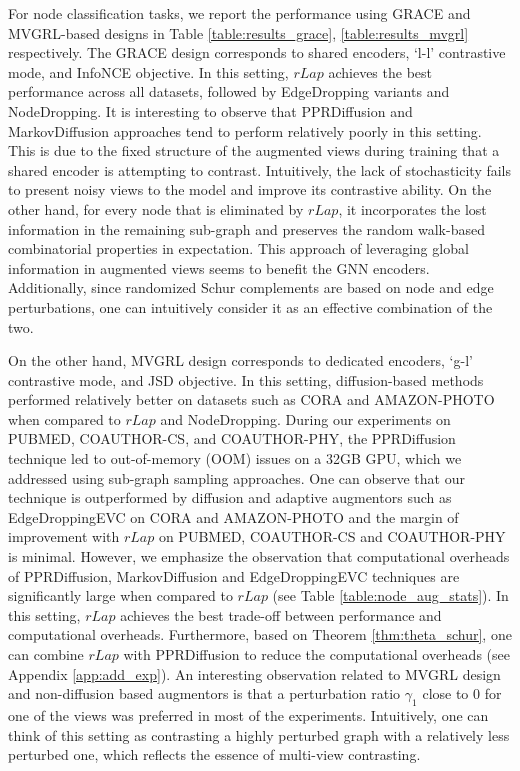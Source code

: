 \documentclass{article}
\theoremstyle{plain}
\theoremstyle{definition}
\theoremstyle{remark}
\begin{document}
For node classification tasks, we report the performance using GRACE and MVGRL-based designs in Table \ref{table:results_grace}, \ref{table:results_mvgrl} respectively. The GRACE design corresponds to shared encoders, `l-l' contrastive mode, and InfoNCE objective. In this setting, $rLap$ achieves the best performance across all datasets, followed by EdgeDropping variants and NodeDropping. It is interesting to observe that PPRDiffusion and MarkovDiffusion approaches tend to perform relatively poorly in this setting. This is due to the fixed structure of the augmented views during training that a shared encoder is attempting to contrast. Intuitively, the lack of stochasticity fails to present noisy views to the model and improve its contrastive ability. On the other hand, for every node that is eliminated by $rLap$, it incorporates the lost information in the remaining sub-graph and preserves the random walk-based combinatorial properties in expectation. This approach of leveraging global information in augmented views seems to benefit the GNN encoders. Additionally, since randomized Schur complements are based on node and edge perturbations, one can intuitively consider it as an effective combination of the two.

On the other hand, MVGRL design corresponds to dedicated encoders, `g-l' contrastive mode, and JSD objective. In this setting, diffusion-based methods performed relatively better on datasets such as CORA and AMAZON-PHOTO when compared to $rLap$ and NodeDropping. During our experiments on PUBMED, COAUTHOR-CS, and COAUTHOR-PHY, the PPRDiffusion technique led to out-of-memory (OOM) issues on a 32GB GPU, which we addressed using sub-graph sampling approaches. One can observe that our technique is outperformed by diffusion and adaptive augmentors such as EdgeDroppingEVC on CORA and AMAZON-PHOTO and the margin of improvement with $rLap$ on PUBMED, COAUTHOR-CS and COAUTHOR-PHY is minimal. However, we emphasize the observation that computational overheads of PPRDiffusion, MarkovDiffusion and EdgeDroppingEVC techniques are significantly large when compared to $rLap$ (see Table \ref{table:node_aug_stats}). In this setting, $rLap$ achieves the best trade-off between performance and computational overheads. Furthermore, based on Theorem \ref{thm:theta_schur}, one can combine $rLap$ with PPRDiffusion to reduce the computational overheads (see Appendix \ref{app:add_exp}). An interesting observation related to MVGRL design and non-diffusion based augmentors is that a perturbation ratio $\gamma_1$ close to $0$ for one of the views was preferred in most of the experiments. Intuitively, one can think of this setting as contrasting a highly perturbed graph with a relatively less perturbed one, which reflects the essence of multi-view contrasting.
\end{document}
